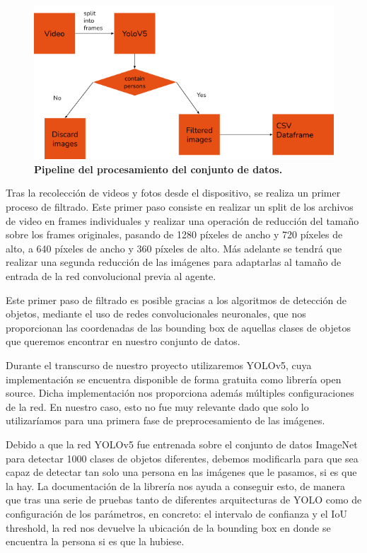\begin{figure}[ht!]
    \centering
    \includegraphics[scale=0.7]{figuras/data_preprocessing.png}
    \caption[Pipeline del procesamiento del conjunto de datos]{\textbf{Pipeline del procesamiento del conjunto de datos.}}
    \label{fig-preprocesamiento-datos}
\end{figure}


Tras la recolección de videos y fotos desde el dispositivo, se realiza un primer proceso de filtrado. Este primer paso consiste en realizar un split de los archivos de video en frames individuales y realizar una operación de reducción del tamaño sobre los frames originales, pasando de 1280 píxeles de ancho y 720 píxeles de alto, a 640 píxeles de ancho y 360 píxeles de alto. Más adelante se tendrá que realizar una segunda reducción de las imágenes para adaptarlas al tamaño de entrada de la red convolucional previa al agente.
\medskip

Este primer paso de filtrado es posible gracias a los algoritmos de detección de objetos, mediante el uso de redes convolucionales neuronales, que nos proporcionan las coordenadas de las bounding box de aquellas clases de objetos que queremos encontrar en nuestro conjunto de datos.
\medskip

Durante el transcurso de nuestro proyecto utilizaremos YOLOv5, cuya implementación se encuentra disponible de forma gratuita como librería open source. Dicha implementación nos proporciona además múltiples configuraciones de la red. En nuestro caso, esto no fue muy relevante dado que solo lo utilizaríamos para una primera fase de preprocesamiento de las imágenes.
\medskip

Debido a que la red YOLOv5 fue entrenada sobre el conjunto de datos ImageNet \citep{imagenet} para detectar 1000 clases de objetos diferentes, debemos modificarla para que sea capaz de detectar tan solo una persona en las imágenes que le pasamos, si es que la hay. La documentación de la librería nos ayuda a conseguir esto, de manera que tras una serie de pruebas tanto de diferentes arquitecturas de YOLO como de configuración de los parámetros, en concreto: el intervalo de confianza y  el IoU threshold, la red nos devuelve la ubicación de la bounding box en donde se encuentra la persona si es que la hubiese.
\medskip

